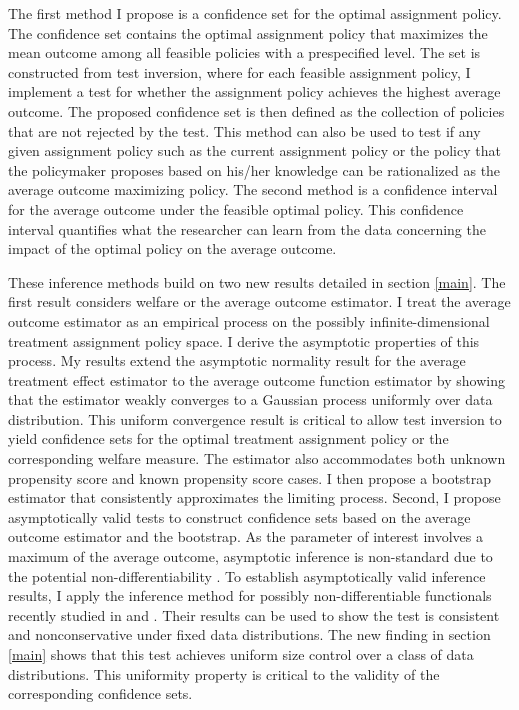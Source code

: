 \documentclass[12pt,oneside,reqno,english]{amsart}
\theoremstyle{definition}
\begin{document}
The first method I propose is a confidence set for the optimal assignment policy. 
The confidence set contains the optimal assignment policy that maximizes the mean outcome among all feasible policies with a prespecified level.
The set is constructed from test inversion, where for each feasible assignment policy, I implement a test for whether the assignment policy 
achieves the highest average outcome. The proposed confidence set is then defined as the collection of policies that are not rejected by the test. 
This method can also be used to test if any given assignment policy such as the current assignment policy or the policy that the policymaker proposes based on his/her knowledge can be rationalized as the average outcome maximizing policy. The second method is a confidence interval for the average outcome under the feasible optimal policy. This confidence interval quantifies what the researcher can learn from the data concerning the impact of the optimal policy on the average outcome. 


These inference methods build on two new results detailed in section \ref{main}. 
The first result considers welfare or the average outcome estimator.
I treat the average outcome estimator as an empirical process on the possibly infinite-dimensional treatment assignment policy space. I derive the asymptotic 
properties of this process. My results extend the asymptotic normality result for the average treatment effect estimator to the average outcome function estimator by showing that the estimator weakly converges to a Gaussian process uniformly over data distribution. This uniform convergence result is critical to allow test inversion to yield confidence sets for the optimal treatment assignment policy or the corresponding welfare measure. The estimator also accommodates both unknown propensity score and known propensity score cases. I then propose a bootstrap estimator that consistently approximates the limiting process. 
Second, I propose asymptotically valid tests to construct confidence sets based on the average outcome estimator and the bootstrap. 
As the parameter of interest involves a maximum of the average outcome, asymptotic inference is non-standard due to the potential non-differentiability \citep{HP:12}. 
To establish asymptotically valid inference results, I apply the 
inference method for possibly non-differentiable functionals recently studied in \cite{FS:16} and \cite{HL:18}. 
Their results can be used to show the test is consistent and nonconservative under fixed data distributions. 
The new finding in section \ref{main} shows that this test achieves uniform size control over a class of data distributions. This uniformity property is critical to the validity of the corresponding confidence sets.   
\end{document}
